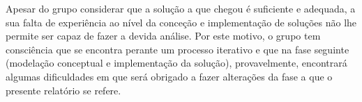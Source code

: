 \documentclass[a4paper,12pt]{scrreprt}
\begin{document}
Apesar do grupo considerar que a solução a que chegou é suficiente e adequada, a sua falta de experiência
ao nível da conceção e implementação de soluções não lhe permite ser capaz de fazer a devida análise.
Por este motivo, o grupo tem consciência que se encontra perante um processo iterativo e que
na fase seguinte (modelação conceptual e implementação da solução), provavelmente, encontrará algumas dificuldades
em que será obrigado a fazer alterações da fase a que o presente relatório se refere.



\renewcommand{\nomname}{Lista de Siglas e Acrónimos}

\renewcommand{\nompreamble}{}


\printnomenclature




 \label{cenarios}






\end{document}
